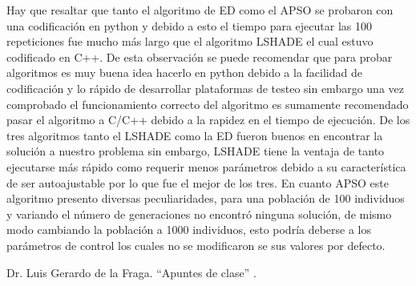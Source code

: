 \documentclass[conference]{IEEEtran}
\begin{document}
Hay que resaltar que tanto el algoritmo de ED como el APSO se probaron con una codificación en python y debido a esto el tiempo para ejecutar las 100 repeticiones fue mucho más largo que el algoritmo LSHADE el cual estuvo codificado en C++. De esta observación se puede recomendar que para probar algoritmos es muy buena idea hacerlo en python debido a la facilidad de codificación y lo rápido de desarrollar plataformas de testeo sin embargo una vez comprobado el funcionamiento correcto del algoritmo es sumamente recomendado pasar el algoritmo a C/C++ debido a la rapidez en el tiempo de ejecución. De los tres algoritmos tanto el LSHADE como la ED fueron buenos en encontrar la solución a nuestro problema sin embargo, LSHADE tiene la ventaja de tanto ejecutarse más rápido como requerir menos parámetros debido a su característica de ser autoajustable por lo que fue el mejor de los tres. En cuanto APSO este algoritmo presento diversas peculiaridades, para una población de 100 individuos y variando el número de generaciones no encontró ninguna solución, de mismo modo cambiando la población a 1000 individuos, esto podría deberse a los parámetros de control los cuales no se modificaron se sus valores por defecto. 

\begin{thebibliography}{00}
  Dr. Luis Gerardo de la Fraga. ``Apuntes de clase'' .
\end{thebibliography}
\end{document}
